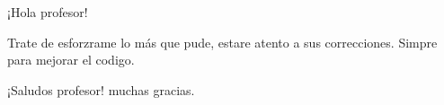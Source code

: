 ¡Hola profesor!

Trate de esforzrame lo más que pude, estare atento a sus correcciones.
Simpre para mejorar el codigo.

¡Saludos profesor!
muchas gracias.